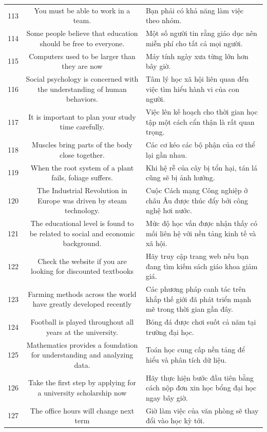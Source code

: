 \documentclass[11pt,a4paper]{article}
\begin{document}
\begin{longtable}{N S M}
113 & You must be able to work in a team. & Bạn phải có khả năng làm việc theo nhóm. \\
114 & Some people believe that education should be free to everyone. & Một số người tin rằng giáo dục nên miễn phí cho tất cả mọi người. \\
115 & Computers used to be larger than they are now & Máy tính ngày xưa từng lớn hơn bây giờ. \\
116 & Social psychology is concerned with the understanding of human behaviors. & Tâm lý học xã hội liên quan đến việc tìm hiểu hành vi của con người. \\
117 & It is important to plan your study time carefully. & Việc lên kế hoạch cho thời gian học tập một cách cẩn thận là rất quan trọng. \\
118 & Muscles bring parts of the body close together. & Các cơ kéo các bộ phận của cơ thể lại gần nhau. \\
119 & When the root system of a plant fails, foliage suffers. & Khi hệ rễ của cây bị tổn hại, tán lá cũng sẽ bị ảnh hưởng. \\
120 & The Industrial Revolution in Europe was driven by steam technology. & Cuộc Cách mạng Công nghiệp ở châu Âu được thúc đẩy bởi công nghệ hơi nước. \\
121 & The educational level is found to be related to social and economic background. & Mức độ học vấn được nhận thấy có mối liên hệ với nền tảng kinh tế và xã hội. \\
122 & Check the website if you are looking for discounted textbooks & Hãy truy cập trang web nếu bạn đang tìm kiếm sách giáo khoa giảm giá. \\
123 & Farming methods across the world have greatly developed recently & Các phương pháp canh tác trên khắp thế giới đã phát triển mạnh mẽ trong thời gian gần đây. \\
124 & Football is played throughout all years at the university. & Bóng đá được chơi suốt cả năm tại trường đại học. \\
125 & Mathematics provides a foundation for understanding and analyzing data. & Toán học cung cấp nền tảng để hiểu và phân tích dữ liệu. \\
126 & Take the first step by applying for a university scholarship now & Hãy thực hiện bước đầu tiên bằng cách nộp đơn xin học bổng đại học ngay bây giờ. \\
127 & The office hours will change next term & Giờ làm việc của văn phòng sẽ thay đổi vào học kỳ tới. \\

\end{longtable}
\end{document}
